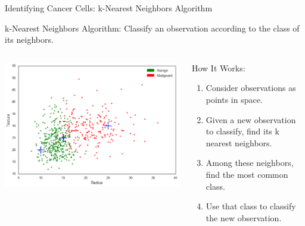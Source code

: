 \documentclass[8pt,aspectratio=169]{beamer}
\begin{document}

\begin{frame}{Identifying Cancer Cells: k-Nearest Neighbors Algorithm}

\pause
k-Nearest Neighbors Algorithm: Classify an observation according to the class of its neighbors.

\begin{columns}[T]
\begin{column}{.48\textwidth}
\begin{center}
\pause
\includegraphics[scale=0.30]{figures/cancer-scatter-plot-examples}
\end{center}
\end{column}

\begin{column}{.48\textwidth}
\vspace{5mm}
\pause
How It Works:

\begin{enumerate}
\pause \item Consider observations as points in space.
\pause \item Given a new observation to classify, find its k nearest neighbors.
\pause \item Among these neighbors, find the most common class.
\pause \item Use that class to classify the new observation.
\end{enumerate}
\end{column}
\end{columns}

\end{frame}
\end{document}
